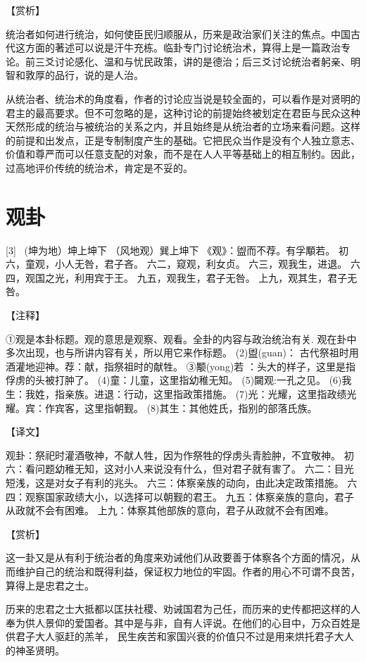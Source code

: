 \documentclass[12pt,UTF8]{ctexbook}
\begin{document}
【赏析】

统治者如何进行统治，如何使臣民归顺服从，历来是政治家们关注的焦点。中国古代这方面的著述可以说是汗牛充栋。临卦专门讨论统治术，算得上是一篇政治专论。前三爻讨论感化、温和与忧民政策，讲的是德治；后三爻讨论统治者躬亲、明智和敦厚的品行，说的是人治。

从统治者、统治术的角度看，作者的讨论应当说是较全面的，可以看作是对贤明的君主的最高要求。但不可忽略的是，这种讨论的前提始终被划定在君臣与民众这种天然形成的统治与被统治的关系之内，并且始终是从统治者的立场来看问题。这样的前提和出发点，正是专制制度产生的基础。它把民众当作是没有个人独立意志、价值和尊严而可以任意支配的对象，而不是在人人平等基础上的相互制约。因此，过高地评价传统的统治术，肯定是不妥的。

\chapter{观卦}
[3] \ (坤为地）坤上坤下
（风地观）巽上坤下
《观》：盥而不荐。有孚顒若。
初六，童观，小人无咎，君子吝。
六二，窥观，利女贞。
六三，观我生，进退。
六四，观国之光，利用宾于王。
九五，观我生，君子无咎。
上九，观其生，君子无咎。

【注释】

①观是本卦标题。观的意思是观察、观看。全卦的内容与政治统治有关. 观在卦中多次出现，也与所讲内容有关，所以用它来作标题。
(2)盥(guan)： 古代祭祖时用酒灌地迎神。荐：献，指祭祖时的献牲。
③颙(yong)若 ：头大的样子，这里是指俘虏的头被打肿了。
(4)童：儿童，这里指幼稚无知。
(5)闚观:一孔之见。
(6)我生：我姓，指亲族。进退：行动，这里指政策措施。
(7)光：光耀，这里指政绩光耀。宾：作宾客，这里指朝觐。
(8)其生：其他姓氏，指别的部落氏族。

【译文】

观卦：祭祀时灌酒敬神，不献人牲，因为作祭牲的俘虏头青脸肿，不宜敬神。
初六：看问题幼稚无知，这对小人来说没有什么，但对君子就有害了。
六二：目光短浅，这是对女子有利的兆头。
六三：体察亲族的动向，由此决定政策措施。
六四：观察国家政绩大小，以选择可以朝觐的君王。
九五：体察亲族的意向，君子从政就不会有困难。
上九：体察其他部族的意向，君子从政就不会有困难。

【赏析】

这一卦又是从有利于统治者的角度来劝诫他们从政要善于体察各个方面的情况，从而维护自己的统治和既得利益，保证权力地位的牢固。作者的用心不可谓不良苦，算得上是忠君之士。

历来的忠君之士大抵都以匡扶社稷、劝诫国君为己任，而历来的史传都把这样的人奉为供人景仰的爱国者。其中是与非，自有人评说。在他们的心目中，万众百姓是供君子大人驱赶的羔羊， 民生疾苦和家国兴衰的价值只不过是用来烘托君子大人的神圣贤明。
\end{document}
